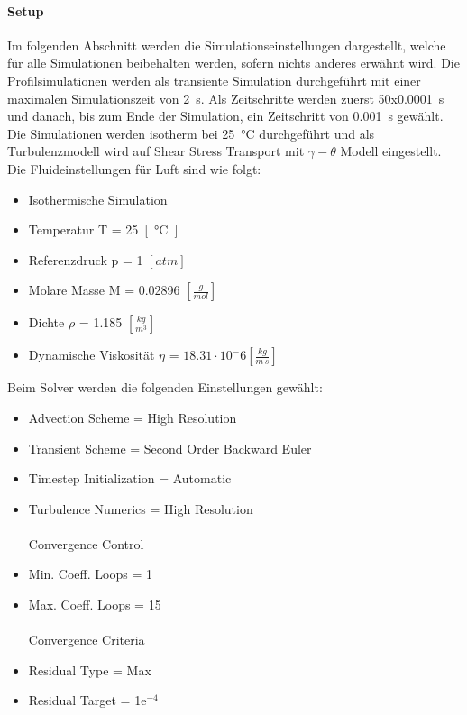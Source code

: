 \paragraph{Setup} 
\label{para:setup}
$\;$\\
Im folgenden Abschnitt werden die Simulationseinstellungen dargestellt, welche für alle Simulationen beibehalten werden, sofern nichts anderes erwähnt wird. Die Profilsimulationen werden als transiente Simulation durchgeführt mit einer maximalen Simulationszeit von \SI{2}{\second}. Als Zeitschritte werden zuerst 50x\SI{0.0001}{\second} und danach, bis zum Ende der Simulation, ein Zeitschritt von \SI{0.001}{\second} gewählt.\\
Die Simulationen werden isotherm bei \SI{25}{\celsius} durchgeführt und als Turbulenzmodell wird auf Shear Stress Transport mit $\gamma-\theta$ 
Modell eingestellt.\\
Die Fluideinstellungen für Luft sind wie folgt:

        \begin{itemize}
        \item Isothermische Simulation 
        \item Temperatur T             =       \SI{25}{[\celsius]}
        \item Referenzdruck p  =       1 $\left[atm\right]$
        \item Molare Masse M           =       0.02896 $\left[\frac{g}{mol}\right]$ 
        \item Dichte $\rho$                   =       1.185 $\left[\frac{kg}{m^3}\right]$ 
        \item Dynamische Viskosität $\eta$ = $18.31\cdot 10^-6 \left[\frac{kg}{m\, s}\right]$\\
        \end{itemize}


Beim Solver werden die folgenden Einstellungen gewählt:
\begin{itemize}
        \item Advection Scheme         = High Resolution 
        \item Transient Scheme         =       Second Order Backward Euler
        \item Timestep Initialization  =       Automatic
        \item Turbulence Numerics             =       High Resolution\\
        \\
        Convergence Control
        \item Min. Coeff. Loops               = 1
        \item Max. Coeff. Loops               = 15\\
        \\Convergence Criteria         
               
        \item Residual Type            = Max
        \item Residual Target          = 1e$^{-4}$ 
\end{itemize}

